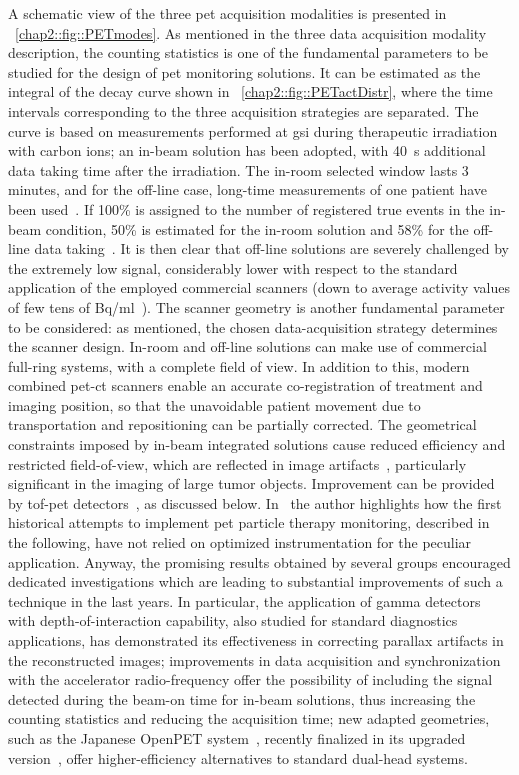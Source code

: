 A schematic view of the three \gls{pet} acquisition modalities is presented in \figurename~\ref{chap2::fig::PETmodes}. As mentioned in the three data acquisition modality description, the counting statistics is one of the fundamental parameters to be studied for the design of \gls{pet} monitoring solutions. It can be estimated as the integral of the decay curve shown in \figurename~\ref{chap2::fig::PETactDistr}, where the time intervals corresponding to the three acquisition strategies are separated. The curve is based on measurements performed at \gls{gsi} during therapeutic irradiation with carbon ions; an in-beam solution has been adopted, with 40~s additional data taking time after the irradiation. The in-room selected window lasts 3 minutes, and for the off-line case, long-time measurements of one patient have been used~\parencite{Fiedler2008b}. If 100\% is assigned to the number of registered true events in the in-beam condition, 50\% is estimated for the in-room solution and 58\% for the off-line data taking~\parencite{Shakirin2011}. It is then clear that off-line solutions are severely challenged by the extremely low signal, considerably lower with respect to the standard application of the employed commercial scanners (down to average activity values of few tens of Bq/ml~\parencite{Bauer2013}).
The scanner geometry is another fundamental parameter to be considered: as mentioned, the chosen data-acquisition strategy determines the scanner design. In-room and off-line solutions can make use of commercial full-ring systems, with a complete field of view. In addition to this, modern combined \gls{pet}-\gls{ct} scanners enable an accurate co-registration of treatment and imaging position, so that the unavoidable patient movement due to transportation and repositioning can be partially corrected. The geometrical constraints imposed by in-beam integrated solutions cause reduced efficiency and restricted field-of-view, which are reflected in image artifacts~\parencite{Crespo2006}, particularly significant in the imaging of large tumor objects. Improvement can be provided by \gls{tof}-\gls{pet} detectors~\parencite{Crespo2007, Surti2011}, as discussed below.
In~\cite{Parodi2015} the author highlights how the first historical attempts to implement \gls{pet} particle therapy monitoring, described in the following, have not relied on optimized instrumentation for the peculiar application. Anyway, the promising results obtained by several groups encouraged dedicated investigations which are leading to substantial improvements of such a technique in the last years. In particular, the application of gamma detectors with depth-of-interaction capability, also studied for standard diagnostics applications, has demonstrated its effectiveness in correcting parallax artifacts in the reconstructed images; improvements in data acquisition and synchronization with the accelerator radio-frequency offer the possibility of including the signal detected during the beam-on time for in-beam solutions, thus increasing the counting statistics and reducing the acquisition time; new adapted geometries, such as the Japanese OpenPET system~\parencite{Tashima2012, Yamaya2008}, recently finalized in its upgraded version~\parencite{Yamaya2017}, offer higher-efficiency alternatives to standard dual-head systems. 
